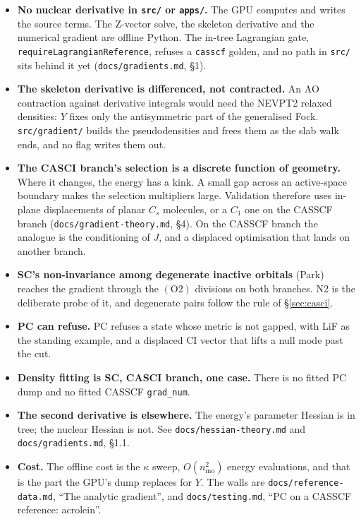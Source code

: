 \documentclass[11pt]{article}
\newcommand{\code}[1]{\texttt{#1}}
\newcommand{\cons}[1]{\ensuremath{(\mathrm{#1})}}
\begin{document}
\begin{itemize}
\item \textbf{No nuclear derivative in \code{src/} or \code{apps/}.} The GPU
  computes and writes the source terms. The Z-vector solve, the skeleton
  derivative and the numerical gradient are offline Python. The in-tree
  Lagrangian gate, \code{requireLagrangianReference}, refuses a \code{casscf}
  golden, and no path in \code{src/} sits behind it yet
  (\code{docs/gradients.md}, \S1).
\item \textbf{The skeleton derivative is differenced, not contracted.} An AO
  contraction against derivative integrals would need the NEVPT2 relaxed
  densities: $Y$ fixes only the antisymmetric part of the generalised Fock.
  \code{src/gradient/} builds the pseudodensities and frees them as the slab
  walk ends, and no flag writes them out.
\item \textbf{The CASCI branch's selection is a discrete function of geometry.}
  Where it changes, the energy has a kink. A small gap across an active-space
  boundary makes the selection multipliers large. Validation therefore uses
  in-plane displacements of planar $C_s$ molecules, or a $C_1$ one on the
  CASSCF branch (\code{docs/gradient-theory.md}, \S4). On the CASSCF branch
  the analogue is the conditioning of $J$, and a displaced optimisation that
  lands on another branch.
\item \textbf{SC's non-invariance among degenerate inactive orbitals} (Park)
  reaches the gradient through the \cons{O2} divisions on both branches. N2 is
  the deliberate probe of it, and degenerate pairs follow the rule of
  \S\ref{sec:casci}.
\item \textbf{PC can refuse.} PC refuses a state whose metric is not gapped,
  with LiF as the standing example, and a displaced CI vector that lifts a null
  mode past the cut.
\item \textbf{Density fitting is SC, CASCI branch, one case.} There is no
  fitted PC dump and no fitted CASSCF \code{grad\_num}.
\item \textbf{The second derivative is elsewhere.} The energy's parameter
  Hessian is in tree; the nuclear Hessian is not. See
  \code{docs/hessian-theory.md} and \code{docs/gradients.md}, \S1.1.
\item \textbf{Cost.} The offline cost is the $\kappa$ sweep, $O(n_{\mathrm{mo}}^2)$
  energy evaluations, and that is the part the GPU's dump replaces for $Y$.
  The walls are \code{docs/reference-data.md}, ``The analytic gradient'', and
  \code{docs/testing.md}, ``PC on a CASSCF reference: acrolein''.
\end{itemize}
\end{document}
